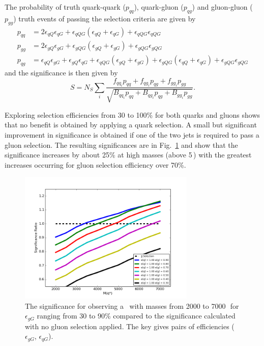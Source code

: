 The probability of truth quark-quark ($p_{qq}$), quark-gluon ($p_{qg}$) and gluon-gluon ($p_{gg}$) truth 
events of passing the selection criteria are given by 
\begin{align}
p_{qq} & = 2  \epsilon_{qQ}\epsilon_{qG} + \epsilon_{qQG}\left( \epsilon_{qQ} + \epsilon_{qG} \right)  + \epsilon_{qQG}\epsilon_{qQG} \\
p_{gg} & = 2  \epsilon_{gQ}\epsilon_{gG} + \epsilon_{gQG}\left( \epsilon_{gQ} + \epsilon_{gG} \right)  + \epsilon_{gQG}\epsilon_{gQG} \\
p_{qg} & = \epsilon_{qQ}\epsilon_{gG} + \epsilon_{gQ}\epsilon_{qG} + \epsilon_{qQG}\left( \epsilon_{gQ} + \epsilon_{gG} \right) 
+ \epsilon_{gQG}\left( \epsilon_{qQ} + \epsilon_{qG} \right) 
+ \epsilon_{gQG}\epsilon_{gQG}
\end{align}
and the significance is then given by 
\begin{equation}
S = N_S \sum_i{ \dfrac{ f_{{qq}_i} p_{qq} + f_{{qg}_i}p_{qg} + f_{{gg}_i}p_{gg}  } {\sqrt{ B_{{qq}_i}p_{qq} + B_{{qg}_i}p_{qg} + B_{{gg}_i}p_{gg}  }}}.
\end{equation}

Exploring selection efficiencies from 30 to 100\% for both quarks and gluons shows that no benefit 
is obtained by applying a quark selection. A small but significant improvement in significance is obtained 
if one of the two jets is required to pass a gluon selection. The resulting significances are  in Fig.~\ref{fig:QuarkGluonSignalSignificance}
and show that the significance increases by about 25\% at high masses (above 5\,\TeV ) with the greatest 
increases  occurring for gluon selection efficiency over 70\%. 


\begin{figure}[htb]
 \centering
\includegraphics[width=0.75\textwidth]{figures/tagging/QuarkGluonSignalSignificance3.png}
\caption{ The significance for observing a \qstar\ with masses from 2000 to 7000\,\GeV\ 
for $\epsilon_{gG}$ ranging from 30 to 90\% compared to the significance calculated with no gluon selection applied. The key gives pairs of efficiencies ($\epsilon_{gG}$, $\epsilon_{qG}$).
  \label{fig:QuarkGluonSignalSignificance}}
\end{figure}


